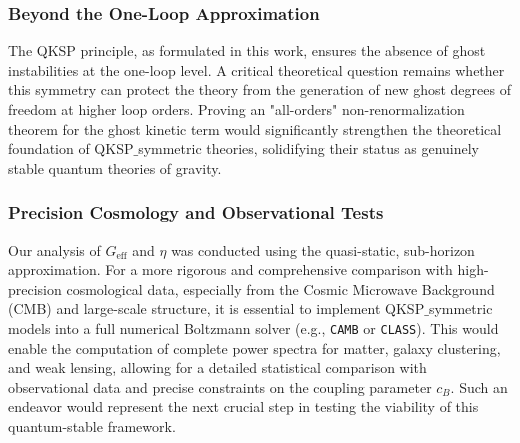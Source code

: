 \documentclass[twocolumn]{aastex631}
\begin{document}
\subsubsection{Beyond the One-Loop Approximation}
The QKSP principle, as formulated in this work, ensures the absence of ghost instabilities at the one-loop level. A critical theoretical question remains whether this symmetry can protect the theory from the generation of new ghost degrees of freedom at higher loop orders. Proving an "all-orders" non-renormalization theorem for the ghost kinetic term would significantly strengthen the theoretical foundation of QKSP\ensuremath{\_}symmetric theories, solidifying their status as genuinely stable quantum theories of gravity.

\subsubsection{Precision Cosmology and Observational Tests}
Our analysis of $G_{\text{eff}}$ and $\eta$ was conducted using the quasi-static, sub-horizon approximation. For a more rigorous and comprehensive comparison with high-precision cosmological data, especially from the Cosmic Microwave Background (CMB) and large-scale structure, it is essential to implement QKSP\ensuremath{\_}symmetric models into a full numerical Boltzmann solver (e.g., \texttt{CAMB} or \texttt{CLASS}). This would enable the computation of complete power spectra for matter, galaxy clustering, and weak lensing, allowing for a detailed statistical comparison with observational data and precise constraints on the coupling parameter $c_B$. Such an endeavor would represent the next crucial step in testing the viability of this quantum-stable framework.
\end{document}
